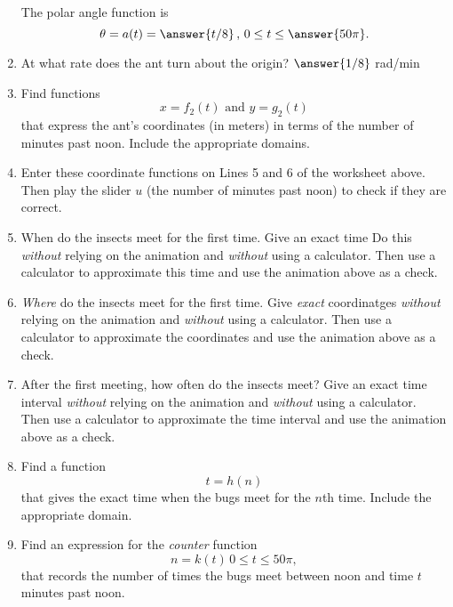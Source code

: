 \documentclass{ximera}
\begin{document}
\begin{example}
\begin{enumerate}
The polar angle function is
\[
   \theta = a(t) = \answer{t/8} \, , \, 0 \leq t \leq \answer{50\pi} .
\]

\item At what rate does the ant turn about the origin?  $\answer{1/8}$ rad/min



\item Find functions
\[
   x = f_2(t) \text{ and } y=g_2(t)
\]
that express the ant's coordinates (in meters)  in terms of the number of minutes past noon. Include the appropriate domains.


\item Enter these coordinate functions on Lines 5 and 6 of the worksheet above. Then play the slider $u$ (the number of minutes past noon) to check if they are correct.

\item When do the insects meet for the first time. Give an exact time Do this \emph{without} relying on the animation and \emph{without} using a calculator. Then use a calculator to approximate this time and use the animation above as a check.

\item \emph{Where} do the insects meet for the first time. Give \emph{exact} coordinatges \emph{without} relying on the animation and \emph{without} using a calculator. Then use a calculator to approximate the coordinates and use the animation above as a check.

\item After the first meeting, how often do the insects meet? Give an exact time interval \emph{without} relying on the animation and \emph{without} using a calculator. Then use a calculator to approximate the time interval and use the animation above as a check.

\item Find a function 
\[
    t = h(n)
\]
that gives the exact time when the bugs meet for the $n$th time. Include the appropriate domain.

\item Find an expression for the \emph{counter} function 
\[
      n = k(t) \, 0\leq t \leq 50\pi , 
\]
that records the number of times the bugs meet between noon and time $t$ minutes past noon.

\end{enumerate}

\end{example}
\end{document}
